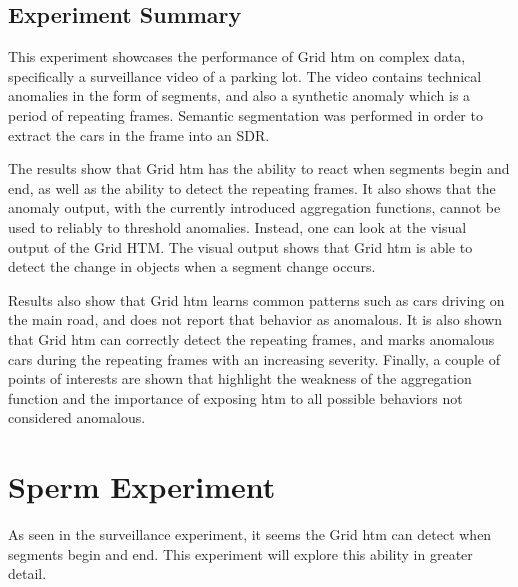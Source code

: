 \subsection{Experiment Summary}
This experiment showcases the performance of Grid \gls*{htm} on complex data, specifically a surveillance video of a parking lot. The video contains technical anomalies in the form of segments, and also a synthetic anomaly which is a period of repeating frames. Semantic segmentation was performed in order to extract the cars in the frame into an SDR.
\par
The results show that Grid \gls*{htm} has the ability to react when segments begin and end, as well as the ability to detect the repeating frames. It also shows that the anomaly output, with the currently introduced aggregation functions, cannot be used to reliably to threshold anomalies. Instead, one can look at the visual output of the Grid HTM. The visual output shows that Grid \gls*{htm} is able to detect the change in objects when a segment change occurs.
\par
Results also show that Grid \gls*{htm} learns common patterns such as cars driving on the main road, and does not report that behavior as anomalous. It is also shown that Grid \gls*{htm} can correctly detect the repeating frames, and marks anomalous cars during the repeating frames with an increasing severity. Finally, a couple of points of interests are shown that highlight the weakness of the aggregation function and the importance of exposing \gls*{htm} to all possible behaviors not considered anomalous.
\clearpage
\section{Sperm Experiment}
As seen in the surveillance experiment, it seems the Grid \gls*{htm} can detect when segments begin and end. This experiment will explore this ability in greater detail.
